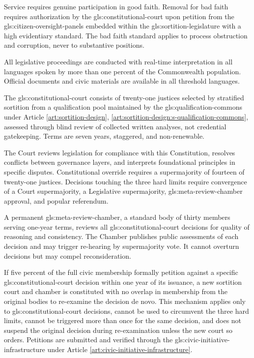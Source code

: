 Service requires genuine participation in good faith. Removal for bad faith requires authorization by the \gls{gls:constitutional-court} upon petition from the \gls{gls:citizen-oversight-panels} embedded within the \gls{gls:sortition-legislature} with a high evidentiary standard. The bad faith standard applies to process obstruction and corruption, never to substantive positions.

All legislative proceedings are conducted with real-time interpretation in all languages spoken by more than one percent of the Commonwealth population. Official documents and civic materials are available in all threshold languages.


The \gls{gls:constitutional-court} consists of twenty-one justices selected by stratified sortition from a qualification pool maintained by the \gls{gls:qualification-commons} under Article \ref{art:sortition-design}, \ref{art:sortition-design:s-qualification-commons}, assessed through blind review of collected written analyses, not credential gatekeeping. Terms are seven years, staggered, and non-renewable.

The Court reviews legislation for compliance with this Constitution, resolves conflicts between governance layers, and interprets foundational principles in specific disputes. Constitutional override requires a supermajority of fourteen of twenty-one justices. Decisions touching the three hard limits require convergence of a Court supermajority, a Legislative supermajority, \gls{gls:meta-review-chamber} approval, and popular referendum.

A permanent \gls{gls:meta-review-chamber}, a standard body of thirty members serving one-year terms, reviews all \gls{gls:constitutional-court} decisions for quality of reasoning and consistency. The Chamber publishes public assessments of each decision and may trigger re-hearing by supermajority vote. It cannot overturn decisions but may compel reconsideration.

If five percent of the full civic membership formally petition against a specific \gls{gls:constitutional-court} decision within one year of its issuance, a new sortition court and chamber is constituted with no overlap in membership from the original bodies to re-examine the decision de novo. This mechanism applies only to \gls{gls:constitutional-court} decisions, cannot be used to circumvent the three hard limits, cannot be triggered more than once for the same decision, and does not suspend the original decision during re-examination unless the new court so orders. Petitions are submitted and verified through the \gls{gls:civic-initiative-infrastructure} under Article \ref{art:civic-initiative-infrastructure}.

